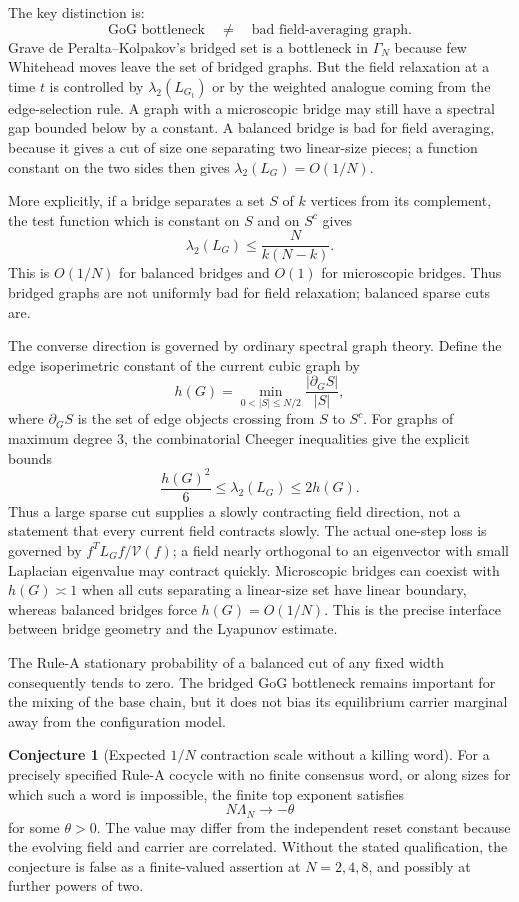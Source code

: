 \documentclass[11pt]{article}
\newcommand{\G}{\Gamma}
\newcommand{\V}{\mathcal V}
\theoremstyle{definition}
\newtheorem{conjecture}[theorem]{Conjecture}
\begin{document}
The key distinction is:
\[
    \text{GoG bottleneck}
    \quad\neq\quad
    \text{bad field-averaging graph}.
\]
Grave de Peralta--Kolpakov's bridged set is a bottleneck in $\G_N$ because few
Whitehead moves leave the set of bridged graphs.  But the field relaxation at a
time $t$ is controlled by $\lambda_2(L_{G_t})$ or by the weighted analogue
coming from the edge-selection rule.  A graph with a microscopic bridge may
still have a spectral gap bounded below by a constant.  A balanced bridge is
bad for field averaging, because it gives a cut of size one separating two
linear-size pieces; a function constant on the two sides then gives
$\lambda_2(L_G)=O(1/N)$.

More explicitly, if a bridge separates a set $S$ of $k$ vertices from its
complement, the test function which is constant on $S$ and on $S^c$ gives
\[
    \lambda_2(L_G)
    \le
    \frac{N}{k(N-k)}.
\]
This is $O(1/N)$ for balanced bridges and $O(1)$ for microscopic bridges.  Thus
bridged graphs are not uniformly bad for field relaxation; balanced sparse cuts
are.

The converse direction is governed by ordinary spectral graph theory.  Define
the edge isoperimetric constant of the current cubic graph by
\[
    h(G)=
    \min_{0<|S|\le N/2}
    \frac{|\partial_G S|}{|S|},
\]
where $\partial_G S$ is the set of edge objects crossing from $S$ to $S^c$.
For graphs of maximum degree $3$, the combinatorial Cheeger inequalities give
the explicit bounds \cite{chung}
\[
    \frac{h(G)^2}{6}\le \lambda_2(L_G)\le 2h(G).
\]
Thus a large sparse cut supplies a slowly contracting field direction, not a
statement that every current field contracts slowly.  The actual one-step
loss is governed by $f^TL_Gf/\V(f)$; a field nearly orthogonal to an
eigenvector with small Laplacian eigenvalue may contract quickly.  Microscopic bridges can
coexist with $h(G)\asymp1$ when all cuts separating a linear-size set have
linear boundary, whereas balanced bridges force $h(G)=O(1/N)$.  This is the
precise interface between bridge geometry and the Lyapunov estimate.

The Rule-A stationary probability of a balanced cut of any fixed width
consequently tends to zero.  The bridged GoG bottleneck remains important for
the mixing of the base chain, but it does not bias its equilibrium carrier
marginal away from the configuration model.

\begin{conjecture}[Expected $1/N$ contraction scale without a killing word]
For a precisely specified Rule-A cocycle with no finite consensus word, or
along sizes for which such a word is impossible, the finite top exponent
satisfies
\[
    N\Lambda_N\to -\theta
\]
for some $\theta>0$.  The value may differ from the independent reset constant
because the evolving field and carrier are correlated.  Without the stated
qualification, the conjecture is false as a finite-valued assertion at
$N=2,4,8$, and possibly at further powers of two.
\end{conjecture}
\end{document}
